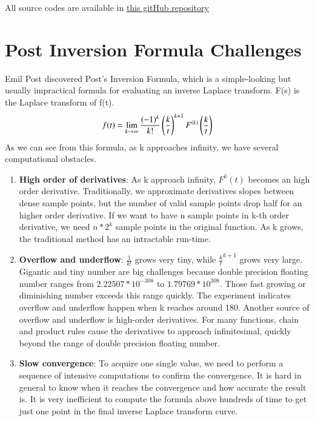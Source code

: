\documentclass[12pt]{article}
\begin{document}
All source codes are available in 
\href{https://github.com/fredzqm/laplace}{this gitHub repository}


\section{Post Inversion Formula Challenges}

Emil Post discovered Post's Inversion Formula, which is a simple-looking but usually impractical formula for evaluating an inverse Laplace transform. F(s) is the Laplace transform of f(t).
\begin{equation*}
f(t) = \lim_{k \rightarrow \infty}\frac{(-1)^{k}}{k!} \left(\frac{k}{t}\right)^{k+1}  F^{(k)} \left(\frac{k}{t}\right)
\end{equation*}
As we can see from this formula, as k approaches infinity, we have several computational obstacles. 
\begin{enumerate}
\item
	\textbf{High order of derivatives}: As k approach infinity, $F^k(t)$ becomes an high order derivative. Traditionally, we approximate derivatives slopes between dense sample points, but the number of valid sample points drop half for an higher order derivative. If we want to have n sample points in k-th order derivative, we need $n*2^{k}$ sample points in the original function. As k grows, the traditional method has an intractable run-time.

\item 
	\textbf{Overflow and underflow}: $\frac{1}{k!}$ grows very tiny, while $\frac{k}{t}^{k+1}$ grows very large. Gigantic and tiny number are big challenges because double precision floating number ranges from $2.22507*10^{-308}$ to  $1.79769*10^{308}$. Those fast growing or diminishing number exceeds this range quickly. The experiment indicates overflow and underflow happen when k reaches around 180.
	Another source of overflow and underflow is high-order derivatives. For many functions, chain and product rules cause the derivatives to approach infinitesimal, quickly beyond the range of double precision floating number.

\item
 	\textbf{Slow convergence}: To acquire one single value, we need to perform a sequence of intensive computations to confirm the convergence. It is hard in general to know when it reaches the convergence and how accurate the result is. It is very inefficient to compute the formula above hundreds of time to get just one point in the final inverse Laplace transform curve.
\end{enumerate}
\end{document}
